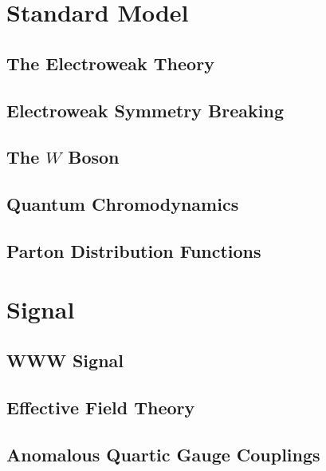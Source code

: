 \section{Standard Model}
\subsection{The Electroweak Theory}
\subsection{Electroweak Symmetry Breaking}
\subsection{The $W$ Boson}
\subsection{Quantum Chromodynamics}
\subsection{Parton Distribution Functions}
\section{Signal}
\subsection{WWW Signal}
\subsection{Effective Field Theory}
\subsection{Anomalous Quartic Gauge Couplings}

